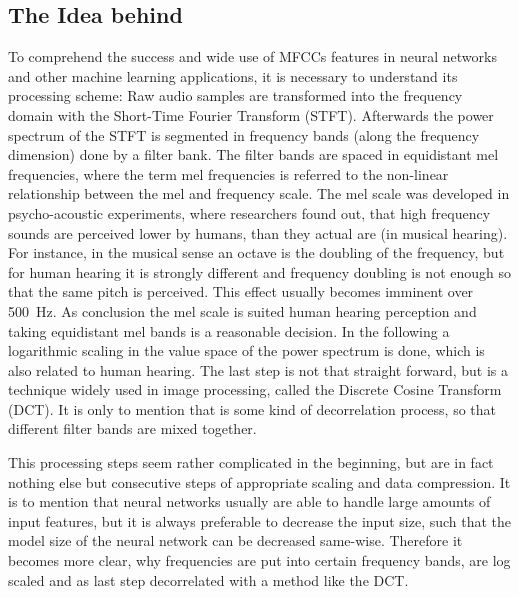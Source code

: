 \subsection{The Idea behind}
To comprehend the success and wide use of MFCCs features in neural networks and other machine learning applications, it is necessary to understand its processing scheme:
Raw audio samples are transformed into the frequency domain with the Short-Time Fourier Transform (STFT).
Afterwards the power spectrum of the STFT is segmented in frequency bands (along the frequency dimension) done by a filter bank.
The filter bands are spaced in equidistant mel frequencies,
where the term mel frequencies is referred to the non-linear relationship between the mel and frequency scale.
The mel scale was developed in psycho-acoustic experiments, where researchers found out, that high frequency sounds are perceived lower by humans, than they actual are (in musical hearing). For instance, in the musical sense an octave is the doubling of the frequency, but for human hearing it is strongly different and frequency doubling is not enough so that the same pitch is perceived.
This effect usually becomes imminent over \SI{500}{\hertz}.
As conclusion the mel scale is suited human hearing perception and taking equidistant mel bands is a reasonable decision.
In the following a logarithmic scaling in the value space of the power spectrum is done, which is also related to human hearing.
The last step is not that straight forward, but is a technique widely used in image processing, called the Discrete Cosine Transform (DCT).
It is only to mention that is some kind of decorrelation process, so that different filter bands are mixed together.

This processing steps seem rather complicated in the beginning, but are in fact nothing else but consecutive steps of appropriate scaling and data compression.
It is to mention that neural networks usually are able to handle large amounts of input features, but it is always preferable to decrease the input size, such that the model size of the neural network can be decreased same-wise.
Therefore it becomes more clear, why frequencies are put into certain frequency bands, are log scaled and as last step decorrelated with a method like the DCT.

